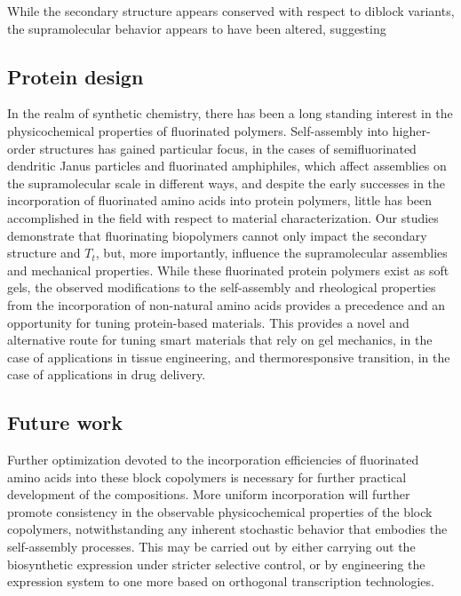 \begin{refsection}
While the secondary structure appears conserved with respect to diblock
variants, the supramolecular behavior appears to have been altered, suggesting

\subsection{Protein design}

In the realm of synthetic chemistry, there has been a long standing interest in
the physicochemical properties of fluorinated polymers. Self-assembly into
higher-order structures has gained particular focus, in the cases of
semifluorinated dendritic Janus particles and fluorinated amphiphiles, which
affect assemblies on the supramolecular scale in different ways, and
despite the early successes in the incorporation of fluorinated amino acids into
protein polymers, little has been accomplished in the field with respect to
material characterization. Our studies demonstrate that fluorinating biopolymers
cannot only impact the secondary structure and ${T_t}$, but, more importantly,
influence the supramolecular assemblies and mechanical properties. While these
fluorinated protein polymers exist as soft gels, the observed modifications to
the self-assembly and rheological properties from the incorporation of
non-natural amino acids provides a precedence and an opportunity for tuning
protein-based materials. This provides a novel and alternative route for tuning
smart materials that rely on gel mechanics, in the case of applications in
tissue engineering, and thermoresponsive transition, in the case of applications
in drug delivery. 

\subsection{Future work}

Further optimization devoted to the incorporation efficiencies of fluorinated
amino acids into these block copolymers is necessary for further practical
development of the compositions. More uniform incorporation will further promote
consistency in the observable physicochemical properties of the block
copolymers, notwithstanding any inherent stochastic behavior that embodies the
self-assembly processes. This may be carried out by either carrying out the
biosynthetic expression under stricter selective control, or by engineering the
expression system to one more based on orthogonal transcription technologies.


\end{refsection}
